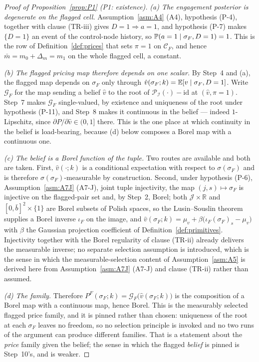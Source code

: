 \begin{proof}[Proof of Proposition~\ref{prop:P1} (P1: existence)]
\emph{(a) The engagement posterior is degenerate on the flagged cell.} Assumption~\ref{asm:A4} (A4),
hypothesis (P-4), together with clause (TR-iii) gives $D = 1 \Rightarrow a = 1$, and hypothesis (P-7)
makes $\{D = 1\}$ an event of the control-node history, so $\mathbb{P}(a = 1 \mid \sigma_F, D=1) = 1$. This
is the row of Definition~\ref{def:prices} that sets $\pi = 1$ on $\mathcal C_F$, and hence
$\bar m = m_0+\Delta_m = m_1$ on the whole flagged cell, a constant.

\emph{(b) The flagged pricing map therefore depends on one scalar.} By Step~4 and (a), the flagged
map depends on $\sigma_F$ only through $\hat v(\sigma_F;k) = \mathbb{E}[v \mid \sigma_F, D=1]$. Write
$\mathcal G_F$ for the map sending a belief $\hat v$ to the root of
$\mathcal P_{\mathcal I}(\cdot)-\mathrm{id}$ at $(\hat v,\pi=1)$. Step~7 makes $\mathcal G_F$
single-valued, by existence and uniqueness of the root under hypothesis (P-11), and Step~8 makes it
continuous in the belief --- indeed $1$-Lipschitz, since $\partial P/\partial\hat v \in (0,1]$ there.
This is the one place at which continuity in the belief is load-bearing, because (d) below composes a
Borel map with a continuous one.

\emph{(c) The belief is a Borel function of the tuple.} Two routes are available and both are taken.
First, $\hat v(\cdot;k)$ is a conditional expectation with respect to $\sigma(\sigma_F)$ and is
therefore $\sigma(\sigma_F)$-measurable by construction. Second, under hypothesis (P-6),
Assumption~\ref{asm:A7J} (A7-J), joint tuple injectivity, the map $(j,s) \mapsto \sigma_F$ is
injective on the flagged-pair set and, by Step~2, Borel; both $\mathcal J \times \mathbb R$ and
$[0,\bar b]^2\times\{1\}$ are Borel subsets of Polish spaces, so the Lusin--Souslin theorem supplies
a Borel inverse $\iota_F$ on the image, and
$\hat v(\sigma_F;k) = \mu_v + \beta\bigl(\iota_F(\sigma_F)_s - \mu_v\bigr)$
with $\beta$ the Gaussian projection coefficient of Definition~\ref{def:primitives}. Injectivity
together with the Borel regularity of clause (TR-ii) already delivers the measurable inverse; no
separate selection assumption is introduced, which is the sense in which the measurable-selection
content of Assumption~\ref{asm:A5} is derived here from Assumption~\ref{asm:A7J} (A7-J) and clause (TR-ii)
rather than assumed.

\emph{(d) The family.} Therefore $P^F(\sigma_F;k) = \mathcal G_F\bigl(\hat v(\sigma_F;k)\bigr)$ is
the composition of a Borel map with a continuous map, hence Borel. This is the measurably selected
flagged price family, and it is pinned rather than chosen: uniqueness of the root at each $\sigma_F$
leaves no freedom, so no selection principle is invoked and no two runs of the argument can produce
different families. That is a statement about the \emph{price} family given the belief; the sense in
which the flagged \emph{belief} is pinned is Step~10's, and is weaker.


\end{proof}
